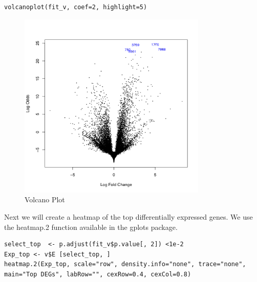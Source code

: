 \begin{steps}
\begin{steps}
\begin{lstlisting}
volcanoplot(fit_v, coef=2, highlight=5)
\end{lstlisting}
\end{steps}

\begin{figure}[H]
\centering
\includegraphics[width=0.8\textwidth]{handout/Volcano.png}
\caption{Volcano Plot}
\label{fig:Volcano plot}
\end{figure}


Next we will create a heatmap of the top differentially expressed genes. We use the heatmap.2 function available in the gplots package.
\begin{steps}
\begin{lstlisting}
select_top  <- p.adjust(fit_v$p.value[, 2]) <1e-2
Exp_top <- v$E [select_top, ]
heatmap.2(Exp_top, scale="row", density.info="none", trace="none", main="Top DEGs", labRow="", cexRow=0.4, cexCol=0.8)

\end{lstlisting}
\end{steps}


\end{steps}
